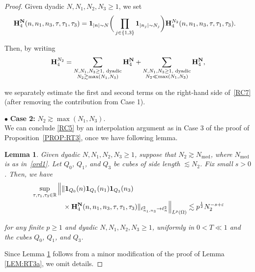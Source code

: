 \documentclass[%
11pt,  reqno]{amsart}
\newtheorem{lemma}[theorem]{Lemma}
\DeclareMathOperator{\med}{med}
\newcommand{\1}{\hspace{0.2mm}\text{I}\hspace{0.2mm}}
\newcommand{\noi}{\noindent}
\newcommand{\R}{\mathbb{R}}
\newcommand{\eps}{\varepsilon}
\renewcommand{\l}{\ell}
\renewcommand{\O}{\Omega}
\newcommand{\les}{\lesssim}
\newcommand{\ges}{\gtrsim}
\newcommand{\ind}{\mathbf 1}
\numberwithin{equation}{section}
\numberwithin{theorem}{section}
\newcommand{\Hb}{\mathbf{H}}
\begin{document}
\begin{proof}
\noi
Given dyadic $N, N_1, N_2, N_3 \ge 1$, 
we set 
\begin{align*}
\Hb_4^{\bf N}(n,n_1,n_3,\tau,\tau_1,\tau_3)
& = \ind_{|n|\sim N}
\bigg(\prod_{j \in\{1, 3\}}
\ind_{|n_j|\sim N_j}
\bigg)\Hb_4^{N_2}(n,n_1,n_3,\tau,\tau_1,\tau_3).
\end{align*}


\noi
Then, by writing 
\begin{align}
\Hb_4^{N_2}
= 
\sum_{\substack{N, N_1, N_3 \ge 1, \text{ dyadic}\\ N_2 \ges \max (N_1, N_3)}} 
\Hb_4^{\bf N}
+ 
\sum_{\substack{N, N_1, N_3 \ge 1, \text{ dyadic}\\ N_2 \ll \max (N_1, N_3)}} 
\Hb_4^{\bf N}, 
\label{RC7}
\end{align}


\noi
 we separately estimate
the first and second terms on the right-hand side of~\eqref{RC7}
(after removing the contribution from Case 1).




\medskip

\noi 
$\bullet$ {\bf Case 2:}
$N_2\ges \max(N_1, N_3)$.
\\
\indent
We can conclude \eqref{RC5}
by 
an interpolation argument 
as in 
 Case 3 of the proof of Proposition~\ref{PROP:RT3},
 once we have  following lemma.


\begin{lemma}\label{LEM:RT4a}
Given dyadic $N, N_1, N_2, N_3 \ge 1$, 
suppose that $N_2 \ges N_{\med}$, where $N_{\med}$ is as in~\eqref{ord1}.
Let $Q_0$, $Q_1$, and $Q_3$
be cubes of side length $\les N_2$.
Fix small $s > 0$.
Then, we have 
\begin{align*}
&  \sup_{\tau,\tau_1,\tau_3\in \R} 
 \Big\| \| 
\ind_{Q_0} (n) \ind_{Q_1} (n_1) \ind_{Q_3} (n_3) \\
&  \hphantom{XXXXX}
\times
\Hb_4^{\bf N}(n,n_1,n_3,\tau,\tau_1,\tau_3) 
 \|_{\l^2_{n_1, n_3} \to \l^2_n} \Big\|_{L^p(\O)}  \les 
p^\frac 12  N_2^{- s + \eps}
\end{align*}


\noi 
for any finite $p \ge 1$
and  dyadic $N, N_1,  N_2, N_3  \ge 1$, 
uniformly in $0 < T \ll 1$
and the cubes $Q_0$, $Q_1$, and $Q_3$.
\end{lemma}


Since Lemma \ref{LEM:RT4a}
follows
from a minor modification of the proof of Lemma \ref{LEM:RT3a}, 
we omit details.





\end{proof}
\end{document}

